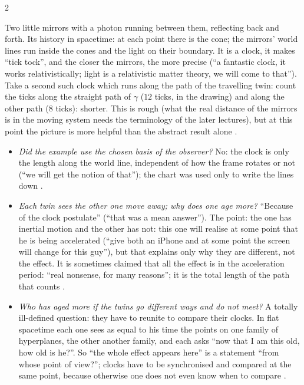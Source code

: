 \begin{paracol}{2}
\begin{example}\label{ex:c13-lightclock}
Two little mirrors with a photon running between them, reflecting back and forth. Its history in spacetime: at each point there is the cone; the mirrors' world lines run inside the cones and the light on their boundary. It is a clock, it makes ``tick tock'', and the closer the mirrors, the more precise (``a fantastic clock, it works relativistically; light is a relativistic matter theory, we will come to that''). Take a second such clock which runs along the path of the travelling twin: count the ticks along the straight path of $\gamma$ ($12$ ticks, in the drawing) and along the other path ($8$ ticks): shorter. This is rough (what the real distance of the mirrors is in the moving system needs the terminology of the later lectures), but at this point the picture is more helpful than the abstract result alone .
\end{example}
\begin{coursenote}
\begin{itemize}
  \item \emph{Did the example use the chosen basis of the observer?} No: the clock is only the length along the world line, independent of how the frame rotates or not (``we will get the notion of that''); the chart was used only to write the lines down .
  \item \emph{Each twin sees the other one move away; why does one age more?} ``Because of the clock postulate'' (``that was a mean answer''). The point: the one has inertial motion and the other has not: this one will realise at some point that he is being accelerated (``give both an iPhone and at some point the screen will change for this guy''), but that explains only why they are different, not the effect. It is sometimes claimed that all the effect is in the acceleration period: ``real nonsense, for many reasons''; it is the total length of the path that counts .
  \item \emph{Who has aged more if the twins go different ways and do not meet?} A totally ill-defined question: they have to reunite to compare their clocks. In flat spacetime each one sees as equal to his time the points on one family of hyperplanes, the other another family, and each asks ``now that I am this old, how old is he?''. So ``the whole effect appears here'' is a statement ``from whose point of view?''; clocks have to be synchronised and compared at the same point, because otherwise one does not even know when to compare .

\end{itemize}
\end{coursenote}
\end{paracol}
